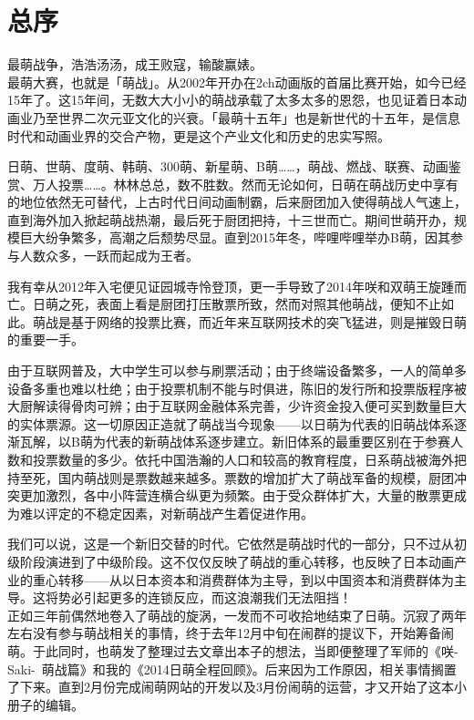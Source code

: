 \chapter*{总序}

最萌战争，浩浩汤汤，成王败寇，输酸赢婊。
\\

最萌大赛，也就是「萌战」。从2002年开办在2ch动画版的首届比赛开始，如今已经15年了。这15年间，无数大大小小的萌战承载了太多太多的恩怨，也见证着日本动画业乃至世界二次元亚文化的兴衰。「最萌十五年」也是新世代的十五年，是信息时代和动画业界的交合产物，更是这个产业文化和历史的忠实写照。

日萌、世萌、度萌、韩萌、300萌、新星萌、B萌……，萌战、燃战、联赛、动画鉴赏、万人投票……。林林总总，数不胜数。然而无论如何，日萌在萌战历史中享有的地位依然无可替代，上古时代日间动画制霸，后来厨团加入使得萌战人气速上，直到海外加入掀起萌战热潮，最后死于厨团把持，十三世而亡。期间世萌开办，规模巨大纷争繁多，高潮之后颓势尽显。直到2015年冬，哔哩哔哩举办B萌，因其参与人数众多，一跃而起成为王者。

我有幸从2012年入宅便见证园城寺怜登顶，更一手导致了2014年咲和双萌王旋踵而亡。日萌之死，表面上看是厨团打压散票所致，然而对照其他萌战，便知不止如此。萌战是基于网络的投票比赛，而近年来互联网技术的突飞猛进，则是摧毁日萌的重要一手。

由于互联网普及，大中学生可以参与刷票活动；由于终端设备繁多，一人的简单多设备多重也难以杜绝；由于投票机制不能与时俱进，陈旧的发行所和投票版程序被大厨解读得骨肉可辨；由于互联网金融体系完善，少许资金投入便可买到数量巨大的实体票源。这一切原因正造就了萌战当今现象——以日萌为代表的旧萌战体系逐渐瓦解，以B萌为代表的新萌战体系逐步建立。新旧体系的最重要区别在于参赛人数和投票数量的多少。依托中国浩瀚的人口和较高的教育程度，日系萌战被海外把持至死，国内萌战则是票数越来越多。票数的增加扩大了萌战军备的规模，厨团冲突更加激烈，各中小阵营连横合纵更为频繁。由于受众群体扩大，大量的散票更成为难以评定的不稳定因素，对新萌战产生着促进作用。

我们可以说，这是一个新旧交替的时代。它依然是萌战时代的一部分，只不过从初级阶段演进到了中级阶段。这不仅仅反映了萌战的重心转移，也反映了日本动画产业的重心转移——从以日本资本和消费群体为主导，到以中国资本和消费群体为主导。这将势必引起更多的连锁反应，而这浪潮我们无法阻挡！
\\

正如三年前偶然地卷入了萌战的旋涡，一发而不可收拾地结束了日萌。沉寂了两年左右没有参与萌战相关的事情，终于去年12月中旬在闹群的提议下，开始筹备闹萌。于此同时，也萌发了整理过去文章出本子的想法，当即便整理了军师的《咲-Saki-~萌战篇》和我的《2014日萌全程回顾》。后来因为工作原因，相关事情搁置了下来。直到2月份完成闹萌网站的开发以及3月份闹萌的运营，才又开始了这本小册子的编辑。

